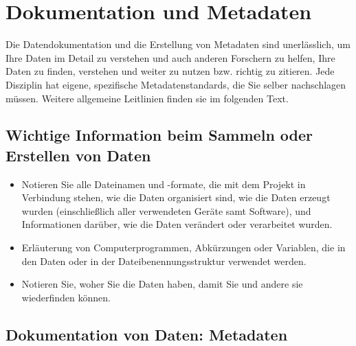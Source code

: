 \section{Dokumentation und Metadaten}

Die Datendokumentation und die Erstellung von Metadaten sind unerlässlich, um
Ihre Daten im Detail zu verstehen und auch anderen Forschern zu helfen, Ihre
Daten zu finden, verstehen und weiter zu nutzen bzw. richtig zu zitieren. Jede
Disziplin hat eigene, spezifische Metadatenstandards, die Sie selber
nachschlagen müssen. Weitere allgemeine Leitlinien finden sie im folgenden Text.

\subsection{Wichtige Information beim Sammeln oder Erstellen von Daten}

\begin{itemize}
  \item Notieren Sie alle Dateinamen und -formate, die mit dem Projekt in
        Verbindung stehen, wie die Daten organisiert sind, wie die Daten
        erzeugt wurden (einschließlich aller verwendeten Geräte samt Software),
        und Informationen darüber, wie die Daten verändert oder verarbeitet
        wurden.
  \item Erläuterung von Computerprogrammen, Abkürzungen oder Variablen, die in
        den Daten oder in der Dateibenennungsstruktur verwendet werden.
  \item Notieren Sie, woher Sie die Daten haben, damit Sie und andere sie
        wiederfinden können.
\end{itemize}

\subsection{Dokumentation von Daten: Metadaten}\label{sc:data-documentation}

